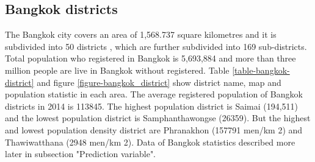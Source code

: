 \documentclass[review]{elsarticle}
\begin{document}
\subsection{Bangkok districts}

The Bangkok city covers an area of 1,568.737 square kilometres and it is subdivided into 50 districts , which are further subdivided into 169 sub-districts. Total population who registered in Bangkok is 5,693,884 and more than three million people are live in Bangkok without registered. Table \ref{table-bangkok-district} and figure \ref{figure-bangkok_district} show district name, map and population statistic in each area. The average registered population of Bangkok districts in 2014 is 113845. The highest population district is Saimai (194,511) and the lowest population district is Samphanthawongse (26359). But the highest and lowest population density district are Phranakhon (157791 men/km 2) and Thawiwatthana (2948 men/km 2).  Data of Bangkok statistics described more later in subsection "Prediction variable".
\end{document}
